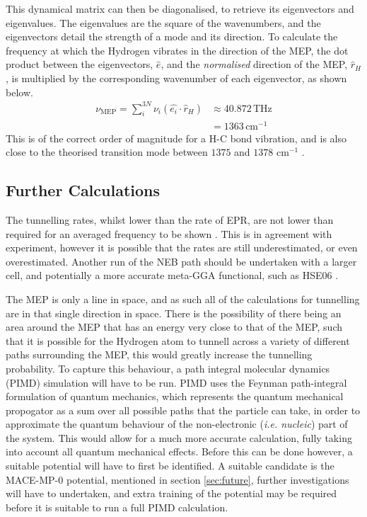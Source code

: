 \documentclass[10pt,a4paper,twocolumn,twoside]{extarticle}
\begin{document}
This dynamical matrix can then be diagonalised, to retrieve its eigenvectors and eigenvalues. The eigenvalues are the square of the wavenumbers, and the eigenvectors detail the strength of a mode and its direction. To calculate the frequency at which the Hydrogen vibrates in the direction of the MEP, the dot product between the eigenvectors, $\hat{e}$, and the \emph{normalised} direction of the MEP, $\hat{r}_H$, is multiplied by the corresponding wavenumber of each eigenvector, as shown below. 
\begin{align}
    \nu_{\text{MEP}} = \sum_{i}^{3N} \nu_i (\hat{e_i} \cdot \hat{r}_H) &\approx 40.872\,\text{THz}\\ 
	&= 1363\,\text{cm}^{-1} \nonumber
\end{align}
This is of the correct order of magnitude for a H-C bond vibration, and is also close to the theorised transition mode between $1375$ and $1378$ cm$^{-1}$ \cite{Peaker,Hartland}.

\subsection{Further Calculations}
The tunnelling rates, whilst lower than the rate of EPR, are not lower than required for an averaged frequency to be shown \cite{Hartland}. This is in agreement with experiment, however it is possible that the rates are still underestimated, or even overestimated. Another run of the NEB path should be undertaken with a larger cell, and potentially a more accurate meta-GGA functional, such as HSE06 \cite{HSE06}. 

The MEP is only a line in space, and as such all of the calculations for tunnelling are in that single direction in space.
There is the possibility of there being an area around the MEP that has an energy very close to that of the MEP, such that it is possible for the Hydrogen atom to tunnell across a variety of different paths surrounding the MEP, this would greatly increase the tunnelling probability. To capture this behaviour, a path integral molecular dynamics (PIMD) simulation will have to be run. PIMD uses the Feynman path-integral formulation of quantum mechanics,  which represents the quantum mechanical propogator as a sum over all possible paths that the particle can take, in order to approximate the quantum behaviour of the non-electronic (\emph{i.e. nucleic}) part of the system. This would allow for a much more accurate calculation, fully taking into account all quantum mechanical effects. 
Before this can be done however, a suitable potential will have to first be identified. A suitable candidate is the MACE-MP-0 \cite{MACE} potential, mentioned in section \ref{sec:future}, further investigations will have to undertaken, and extra training of the potential may be required before it is suitable to run a full PIMD calculation.
\end{document}
